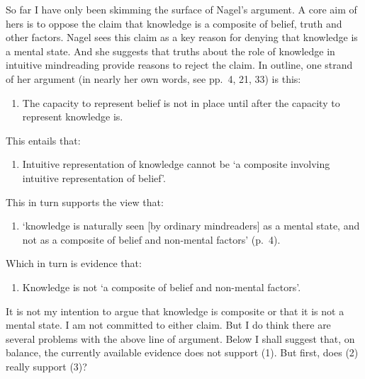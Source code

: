 \documentclass[12pt,\papersize]{extarticle}
\begin{document}
So far I have only been skimming the surface of Nagel's argument.
A core aim of hers is to oppose the claim that knowledge is a composite of belief, truth and other factors.
Nagel sees this claim as a key reason for denying that knowledge is a mental state.
And she suggests that truths about the role of knowledge in intuitive mindreading provide reasons to reject the claim.
In outline, one strand of her argument (in nearly her own words, see pp.\ 4, 21, 33) is this:
%
\begin{enumerate}
\item The capacity to represent belief is not in place until after the capacity to represent knowledge is.
\end{enumerate}
This entails that:
\begin{enumerate}[resume]
\item Intuitive representation of knowledge cannot be `a composite involving intuitive representation of belief'.
\end{enumerate}
This in turn supports the view  that:
\begin{enumerate}[resume]
\item `knowledge is naturally seen [by ordinary mindreaders] as a mental state, and not as a composite of belief and non-mental factors' (p.\ 4).
\end{enumerate}
Which in turn is evidence that:
\begin{enumerate}[resume]
\item Knowledge is not `a composite of belief and non-mental factors'.
\end{enumerate}
%
It is not my intention to argue that knowledge is composite or that it is not a mental state.
I am not committed to either claim.
But I do think there are several problems with the above line of argument.
Below I shall suggest that, on balance, the currently available evidence does not support (1).  
But first, does (2) really support (3)?
\end{document}
